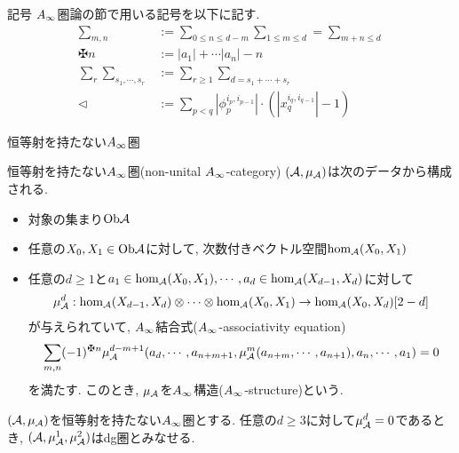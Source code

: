 \documentclass[aspectratio=169, dvipdfmx, 8pt, notheorems, uplatex]{beamer}
\begin{document}
\begin{frame}{記号}
  $A_\infty$圏論の節で用いる記号を以下に記す. 
  \begin{align*}
    \sum_{m,n} &:= \sum_{0 \leq n \leq d-m} \sum_{1 \leq m \leq d} = \sum_{m+n \leq d} \\
    \maltese n &:= |a_1| + \cdots |a_n| - n \\
    \sum_r \sum_{s_1,\cdots,s_r} &:= \sum_{r \geq 1} \sum_{d = s_1 + \cdots + s_r} \\
    \triangleleft &:= \sum_{p < q} |\phi_p^{i_p,i_{p-1}}| \cdot (|x_q^{i_q,i_{q-1}}|-1) 
  \end{align*}
\end{frame}

\begin{frame}{恒等射を持たない$A_\infty$圏} 
  \begin{definition} \label{def_non_unital_Ainf_cat}
    恒等射を持たない$A_\infty$圏(non-unital $A_\infty$-category) $(\mathcal{A},\mu_{\mathcal{A}})$は次のデータから構成される. 
    \begin{itemize}
      \item 対象の集まり$\mathrm{Ob}\mathcal{A}$ 
      \item 任意の$X_0, X_1 \in \mathrm{Ob}\mathcal{A}$に対して, 次数付きベクトル空間$\hom_{\mathcal{A}}(X_0,X_1)$
      \item 任意の$d \geq 1$と$a_1 \in \hom_{\mathcal{A}}(X_0,X_1), \cdots, a_d \in \hom_{\mathcal{A}}(X_{d-1},X_d)$に対して
      \begin{align*}
        \mu^d_{\mathcal{A}} : \hom_{\mathcal{A}}(X_{d-1},X_d) \otimes \cdots \otimes \hom_{\mathcal{A}}(X_0,X_1) \to \hom_{\mathcal{A}}(X_0,X_d)[2-d]
      \end{align*}
      が与えられていて, $A_\infty$結合式($A_\infty$-associativity equation) 
      \begin{align*}
        \sum_{m,n} (-1)^{\maltese n} \mu^{d-m+1}_\A(a_d,\cdots,a_{n+m+1}, \mu^m_\A(a_{n+m},\cdots,a_{n+1}), a_n,\cdots,a_1)
        = 0
      \end{align*}
      を満たす.
      このとき, $\mu_{\mathcal{A}}$を$A_\infty$構造($A_\infty$-structure)という. 
    \end{itemize}
  \end{definition}

  \begin{example}
    $(\mathcal{A},\mu_{\mathcal{A}})$を恒等射を持たない$A_\infty$圏とする. 
    任意の$d \geq 3$に対して$\mu^d_{\mathcal{A}} = 0$であるとき, $(\mathcal{A},\mu^1_{\mathcal{A}},\mu^2_{\mathcal{A}})$はdg圏とみなせる. 
  \end{example}
\end{frame}
\end{document}
